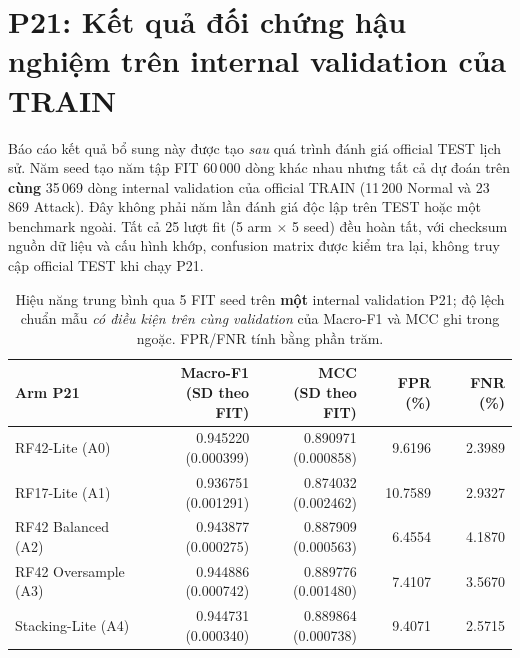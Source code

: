 \section{P21: Kết quả đối chứng hậu nghiệm trên internal validation của TRAIN}
\label{sec:p21-results}
Báo cáo kết quả bổ sung này được tạo \emph{sau} quá trình đánh giá official TEST lịch sử. Năm seed tạo năm tập FIT 60\,000 dòng khác nhau nhưng tất cả dự đoán trên \textbf{cùng} 35\,069 dòng internal validation của official TRAIN (11\,200 Normal và 23\,869 Attack). Đây không phải năm lần đánh giá độc lập trên TEST hoặc một benchmark ngoài. Tất cả 25 lượt fit (5 arm $\times$ 5 seed) đều hoàn tất, với checksum nguồn dữ liệu và cấu hình khớp, confusion matrix được kiểm tra lại, không truy cập official TEST khi chạy P21.

\begin{table}[htbp]\centering
\small
\renewcommand{\arraystretch}{1.26}
\setlength{\tabcolsep}{3pt}
\caption{Hiệu năng trung bình qua 5 FIT seed trên \textbf{một} internal validation P21; độ lệch chuẩn mẫu \emph{có điều kiện trên cùng validation} của Macro-F1 và MCC ghi trong ngoặc. FPR/FNR tính bằng phần trăm.}
\label{tab:p21-five-arm-results}
\begin{tabular}{lrrrr}
\toprule
Arm P21 & \shortstack{Macro-F1\\(SD theo FIT)} & \shortstack{MCC\\(SD theo FIT)} & FPR (\%) & FNR (\%)\\\midrule
RF42-Lite (A0) & \shortstack{0.945220\\{\scriptsize (0.000399)}} & \shortstack{0.890971\\{\scriptsize (0.000858)}} & 9.6196 & 2.3989\\
RF17-Lite (A1) & \shortstack{0.936751\\{\scriptsize (0.001291)}} & \shortstack{0.874032\\{\scriptsize (0.002462)}} & 10.7589 & 2.9327\\
RF42 Balanced (A2) & \shortstack{0.943877\\{\scriptsize (0.000275)}} & \shortstack{0.887909\\{\scriptsize (0.000563)}} & 6.4554 & 4.1870\\
RF42 Oversample (A3) & \shortstack{0.944886\\{\scriptsize (0.000742)}} & \shortstack{0.889776\\{\scriptsize (0.001480)}} & 7.4107 & 3.5670\\
Stacking-Lite (A4) & \shortstack{0.944731\\{\scriptsize (0.000340)}} & \shortstack{0.889864\\{\scriptsize (0.000738)}} & 9.4071 & 2.5715\\\bottomrule
\end{tabular}
\vspace{3pt}


\end{table}

